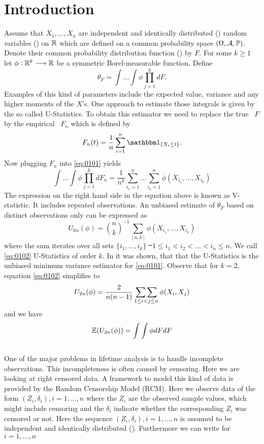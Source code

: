 \chapter{Introduction} \label{ch:introduction}
\label{sec:introduction}

Assume that $X_1,...,X_n$ are independent and identically distributed (\iid) random variables (\rv) on $\mathbb{R}$ which are defined on a common probability space $(\Omega, \mathcal{A}, \mathbb{P})$. Denote their common probability distribution function (\df) by $F$. For some $k\geq 1$ let $\phi: \mathbb{R}^k \longrightarrow \mathbb{R}$ be a symmetric Borel-measurable function. Define
\begin{equation}
\theta_F = \int ... \int \phi \prod\limits_{j=1}^k dF. 
\label{eq:0101}
\end{equation}
Examples of this kind of parameters include the expected value, variance and any higher moments of the $X$'s. One approach to estimate those integrals is given by the so called U-Statistics. To obtain this estimator we need to replace the true \df\ $F$ by the empirical \df\ $F_n$ which is defined by
$$F_n(t) = \frac{1}{n}\sum\limits_{i=1}^n \I{X_i\leq t}.$$
Now plugging $F_n$ into \eqref{eq:0101} yields
$$\int ... \int \phi \prod\limits_{j=1}^k dF_n = \frac{1}{n^k}\sum\limits_{i_1=1}^n...\sum\limits_{i_k=1}^n \phi(X_{i_1},...,X_{i_k})$$
The expression on the right hand side in the equation above is known as V-statistic. It includes repeated observations. An unbiased estimate of $\theta_F$ based on distinct observations only can be expressed as
\begin{equation}
U_{kn}(\phi) = {n \choose k}^{-1} \sum\limits_{[n,k]} \phi(X_{i_1},...,X_{i_k})
\label{eq:0102}
\end{equation}
where the sum iterates over all sets $\{i_1,...,i_k\}$ \st\ $ 1\leq i_1 < i_2 < ... < i_n \leq n$. We call \eqref{eq:0102} U-Statistics of order $k$. In \cite{lee1990u} it was shown, that that the U-Statistics is the unbiased minimum variance estimator for \eqref{eq:0101}. Observe that for $k=2$, equation \eqref{eq:0102} simplifies to
$$U_{2n}(\phi)=\frac{2}{n(n-1)}\mathop{\sum\sum}\limits_{1\leq i<j \leq n}\phi(X_i,X_j)$$
and we have
$$\mathbb{E}(U_{2n}(\phi))=\int \int \phi dF dF$$
\\
One of the major problems in lifetime analysis is to handle incomplete observations. This incompleteness is often caused by censoring. Here we are looking at right censored data. A framework to model this kind of data is provided by the Random Censorship Model (RCM). Here we observe data of the form $(Z_i, \delta_i), i=1,...,n$ where the $Z_i$ are the observed sample values, which might include censoring and the $\delta_i$ indicate whether the corresponding $Z_i$ was censored or not. Here the sequence $(Z_i, \delta_i), i=1,...,n$ is assumed to be independent and identically distributed (\iid). Furthermore we can write for $i=1,...,n$

